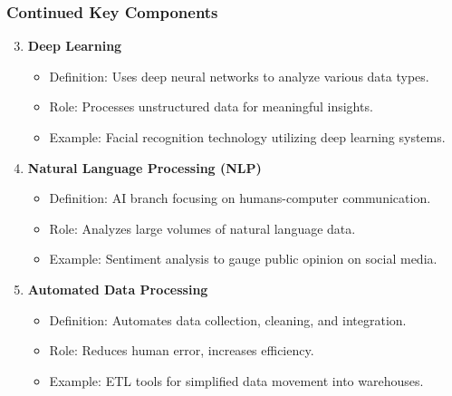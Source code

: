 \documentclass[aspectratio=169]{beamer}
\begin{document}
\begin{frame}[fragile]
    \frametitle{Continued Key Components}
    \begin{enumerate}
        \setcounter{enumi}{2} %
        \item \textbf{Deep Learning}
        \begin{itemize}
            \item Definition: Uses deep neural networks to analyze various data types.
            \item Role: Processes unstructured data for meaningful insights.
            \item Example: Facial recognition technology utilizing deep learning systems.
        \end{itemize}

        \item \textbf{Natural Language Processing (NLP)}
        \begin{itemize}
            \item Definition: AI branch focusing on humans-computer communication.
            \item Role: Analyzes large volumes of natural language data.
            \item Example: Sentiment analysis to gauge public opinion on social media.
        \end{itemize}

        \item \textbf{Automated Data Processing}
        \begin{itemize}
            \item Definition: Automates data collection, cleaning, and integration.
            \item Role: Reduces human error, increases efficiency.
            \item Example: ETL tools for simplified data movement into warehouses.
        \end{itemize}
    \end{enumerate}
\end{frame}
\end{document}

